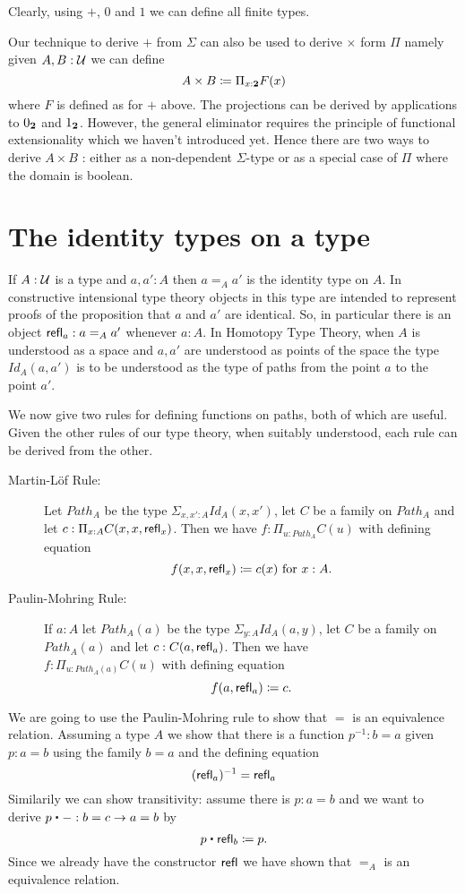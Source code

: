 Clearly, using $+$, $0$ and $1$ we can define all finite types.

Our technique to derive $+$ from $\Sigma$ can also be used to derive
$\times$ form $\Pi$ namely given $A,B:\mathcal{U}$ we can define 
\[ A \times B \coloneqq \Pi_{x:\mathbf{2}}F(x)\]
where $F$ is defined as for $+$ above. The projections can be derived
by applications to $0_\mathbf{2}$ and $1_\mathbf{2}$. However, the general
eliminator requires the principle of functional extensionality which
we haven't introduced yet. Hence there are two ways to derive $A\times
B$ : either as a non-dependent $\Sigma$-type or as a special case of
$\Pi$ where the domain is boolean. 

\section{The identity types on a type}
If $A:\mathcal{U}$ is a type and $a,a':A$ then $a =_A a'$ is the identity type on $A$.  
In constructive intensional type theory objects in this type are
intended to represent proofs of the proposition that $a$ and $a'$ are
identical.  So, in particular there is an object $\mathsf{refl}_{a}: a =_A a'$ whenever $a:A$.  In Homotopy Type Theory, when $A$ is understood as a space and $a,a'$ are understood as points of the space the type $Id_A(a,a')$ is to be understood as the type of paths from the point $a$ to the point $a'$.

We now give two rules for defining functions on paths, both of which are useful.  Given the other rules of our type theory, when suitably understood, each rule can be derived from the other. 

\begin{description}
\item[Martin-L\"{o}f Rule:] Let $Path_A$ be the type $\Sigma_{x,x':A}Id_A(x,x')$, let $C$ be a family on $Path_A$ and let $c:\Pi_{x:A}C(x,x,\mathsf{refl}_{x})$.  Then we have $f:\Pi_{u:Path_A}C(u)$ with defining equation
  \[ f(x,x,\mathsf{refl}_{x})\coloneqq c(x)\mbox{ for } x:A.\]
\item[Paulin-Mohring Rule:] If $a:A$ let $Path_A(a)$ be the type $\Sigma_{y:A}Id_A(a,y)$, let $C$ be a family on $Path_A(a)$ and let $c:C(a,\mathsf{refl}_{a})$. Then we have\\ $f:\Pi_{u:Path_A(a)}C(u)$ with defining equation
    \[ f(a,\mathsf{refl}_{a})\coloneqq c.\]
\end{description}

We are going to use the Paulin-Mohring rule to show that $=$ is an
equivalence relation. Assuming a type $A$ we show that there is a function
$p^{-1} : b = a$ given $p : a = b$ using the family $b = a$ and
the defining equation
\[ (\mathsf{refl}_{a})^{-1} = \mathsf{refl}_{a} \]
Similarily we can show transitivity: assume there is $p : a = b$ and
we want to derive $p \ct - : b = c \to a = b$ by
\[ p \ct \refl{b} \defeq p.\]
Since we already have the constructor $\mathsf{refl}_{}$ we have shown that $=_A$
is an equivalence relation. 


